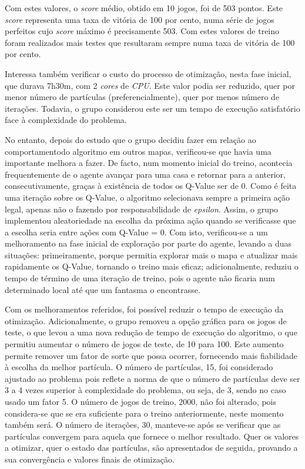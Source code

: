 \documentclass[runningheads]{article}
\begin{document}
\par Com estes valores, o \textit{score} médio, obtido em 10 jogos, foi de 503 pontos. Este \textit{score} representa uma taxa de vitória de 100 por cento, numa série de jogos perfeitos cujo \textit{score} máximo é precisamente 503. Com estes valores de treino foram realizados mais testes que resultaram sempre numa taxa de vitória de 100 por cento.
\par Interessa também verificar o custo do processo de otimização, nesta fase inicial, que durava 7h30m, com 2 \textit{cores} de \textit{CPU}. Este valor podia ser reduzido, quer por menor número de partículas (preferencialmente), quer por menos número de iterações. Todavia, o grupo considerou este ser um tempo de execução satisfatório face à complexidade do problema.
\par No entanto, depois do estudo que o grupo decidiu fazer em relação ao comportamentodo algoritmo em outros mapas, verificou-se que havia uma importante melhora a fazer. De facto, num momento inicial do treino, acontecia frequentemente de o agente avançar para uma casa e retornar para a anterior, consecutivamente, graças à existência de todos os Q-Value ser de 0. Como é feita uma iteração sobre os Q-Value, o algoritmo selecionava sempre a primeira ação legal, apenas não o fazendo por responsabilidade de \textit{epsilon}. Assim, o grupo implementou aleatoriedade na escolha da próxima ação quando se verificasse que a escolha seria entre ações com Q-Value = 0. Com isto, verificou-se a um melhoramento na fase inicial de exploração por parte do agente, levando a duas situações: primeiramente, porque permitia explorar mais o mapa e atualizar mais rapidamente os Q-Value, tornando o treino mais eficaz; adicionalmente, reduziu o tempo de término de uma iteração de treino, pois o agente não ficaria num determinado local até que um fantasma o encontrasse.
\par Com os melhoramentos referidos, foi possível reduzir o tempo de execução da otimização. Adicionalmente, o grupo removeu a opção gráfica para os jogos de teste, o que levou a uma nova redução de tempo de execução do algoritmo, o que permitiu aumentar o número de jogos de teste, de 10 para 100. Este aumento permite remover um fator de sorte que possa ocorrer, fornecendo mais fiabilidade à escolha da melhor partícula. O número de partículas, 15, foi considerado ajustado ao problema pois reflete a norma de que o número de partículas deve ser 3 a 4 vezes superior à complexidade do problema, ou seja, de 3, sendo no caso usado um fator 5. O número de jogos de treino, 2000, não foi alterado, pois considera-se que se era suficiente para o treino anteriormente, neste momento também será. O número de iterações, 30, manteve-se após se verificar que as partículas convergem para aquela que fornece o melhor resultado. Quer os valores a otimizar, quer o estado das partículas, são apresentados de seguida, provando a sua convergência e valores finais de otimização.
\end{document}
